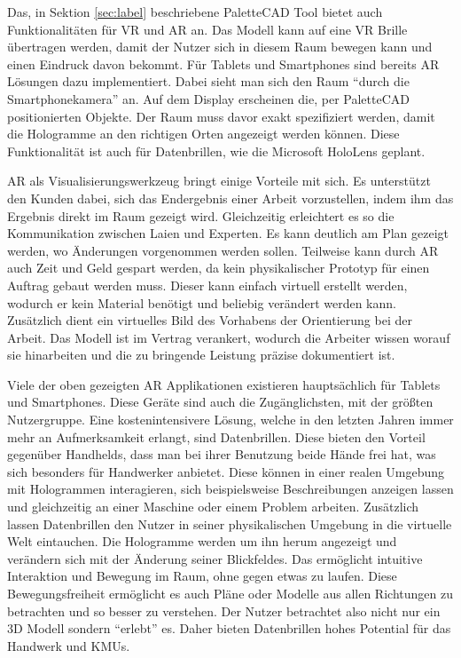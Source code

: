 
Das, in Sektion \ref{sec:label} beschriebene PaletteCAD Tool bietet auch Funktionalitäten für VR und AR an. Das Modell kann auf eine VR Brille übertragen werden, damit der Nutzer sich in diesem Raum bewegen kann und einen Eindruck davon bekommt. Für Tablets und Smartphones sind bereits AR Lösungen dazu implementiert. Dabei sieht man sich den Raum \enquote{durch die Smartphonekamera} an. Auf dem Display erscheinen die, per PaletteCAD positionierten Objekte. Der Raum muss davor exakt spezifiziert werden, damit die Hologramme an den richtigen Orten angezeigt werden können. Diese Funktionalität ist auch für Datenbrillen, wie die Microsoft HoloLens geplant.

AR als Visualisierungswerkzeug bringt einige Vorteile mit sich. Es unterstützt den Kunden dabei, sich das Endergebnis einer Arbeit vorzustellen, indem ihm das Ergebnis direkt im Raum gezeigt wird. Gleichzeitig erleichtert es so die Kommunikation zwischen Laien und Experten. Es kann deutlich am Plan gezeigt werden, wo Änderungen vorgenommen werden sollen. Teilweise kann durch AR auch Zeit und Geld gespart werden, da kein physikalischer Prototyp für einen Auftrag gebaut werden muss. Dieser kann einfach virtuell erstellt werden, wodurch er kein Material benötigt und beliebig verändert werden kann. Zusätzlich dient ein virtuelles Bild des Vorhabens der Orientierung bei der Arbeit. Das Modell ist im Vertrag verankert, wodurch die Arbeiter wissen worauf sie hinarbeiten und die zu bringende Leistung präzise dokumentiert ist.

Viele der oben gezeigten AR Applikationen existieren hauptsächlich für Tablets und Smartphones. Diese Geräte sind auch die Zugänglichsten, mit der größten Nutzergruppe. Eine kostenintensivere Lösung, welche in den letzten Jahren immer mehr an Aufmerksamkeit erlangt, sind Datenbrillen. Diese bieten den Vorteil gegenüber Handhelds, dass man bei ihrer Benutzung beide Hände frei hat, was sich besonders für Handwerker anbietet. Diese können in einer realen Umgebung mit Hologrammen interagieren, sich beispielsweise Beschreibungen anzeigen lassen und gleichzeitig an einer Maschine oder einem Problem arbeiten. Zusätzlich lassen Datenbrillen den Nutzer in seiner physikalischen Umgebung in die virtuelle Welt eintauchen. Die Hologramme werden um ihn herum angezeigt und verändern sich mit der Änderung seiner Blickfeldes. Das ermöglicht intuitive Interaktion und Bewegung im Raum, ohne gegen etwas zu laufen. Diese Bewegungsfreiheit ermöglicht es auch Pläne oder Modelle aus allen Richtungen zu betrachten und so besser zu verstehen. Der Nutzer betrachtet also nicht nur ein 3D Modell sondern \enquote{erlebt} es\cite{TODO:Buchkapitel}. Daher bieten Datenbrillen hohes Potential für das Handwerk und KMUs.